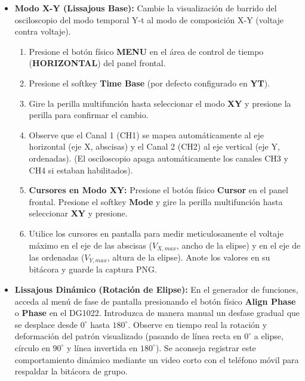 \documentclass[12pt, letterpaper]{article}
\begin{document}
\begin{itemize}
    \item \textbf{Modo X-Y (Lissajous Base):} Cambie la visualización de barrido del osciloscopio del modo temporal Y-t al modo de composición X-Y (voltaje contra voltaje).
    \begin{enumerate}[label=\roman*.]
        \item Presione el botón físico \textbf{MENU} en el área de control de tiempo (\textbf{HORIZONTAL}) del panel frontal.
        \item Presione el softkey \textbf{Time Base} (por defecto configurado en \textbf{YT}).
        \item Gire la perilla multifunción hasta seleccionar el modo \textbf{XY} y presione la perilla para confirmar el cambio.
        \item Observe que el Canal 1 (CH1) se mapea automáticamente al eje horizontal (eje X, abscisas) y el Canal 2 (CH2) al eje vertical (eje Y, ordenadas). (El osciloscopio apaga automáticamente los canales CH3 y CH4 si estaban habilitados).
        \item \textbf{Cursores en Modo XY:} Presione el botón físico \textbf{Cursor} en el panel frontal. Presione el softkey \textbf{Mode} y gire la perilla multifunción hasta seleccionar \textbf{XY} y presione.
        \item Utilice los cursores en pantalla para medir meticulosamente el voltaje máximo en el eje de las abscisas ($V_{X,max}$, ancho de la elipse) y en el eje de las ordenadas ($V_{Y,max}$, altura de la elipse). Anote los valores en su bitácora y guarde la captura PNG.
    \end{enumerate}
    
    \item \textbf{Lissajous Dinámico (Rotación de Elipse):} En el generador de funciones, acceda al menú de fase de pantalla presionando el botón físico \textbf{Align Phase} o \textbf{Phase} en el DG1022. Introduzca de manera manual un desfase gradual que se desplace desde $0^\circ$ hasta $180^\circ$. Observe en tiempo real la rotación y deformación del patrón visualizado (pasando de línea recta en $0^\circ$ a elipse, círculo en $90^\circ$ y línea invertida en $180^\circ$). Se aconseja registrar este comportamiento dinámico mediante un video corto con el teléfono móvil para respaldar la bitácora de grupo.
    

\end{itemize}
\end{document}
